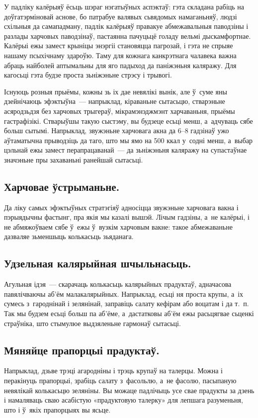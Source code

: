 У падліку калёрыяў ёсьць шэраг нэгатыўных аспэктаў: гэта складана рабіць на доўгатэрміновай аснове, бо патрабуе валявых сьвядомых намаганьняў, людзі схільныя да самападману, падлік калёрыяў правакуе абмежавальныя паводзіны і разлады харчовых паводзінаў, пастаянна пачуцьцё голаду вельмі дыскамфортнае. Калёрыі ежы замест крыніцы энэргіі становяцца пагрозай, і гэта не спрыяе нашаму псыхічнаму здароўю. Таму для кожнага канкрэтнага чалавека важна абраць найболей аптымальны для яго падыход да паніжэньня каляражу. Для кагосьці гэта будзе проста зьніжэньне стрэсу і трывогі.

Існуюць розныя прыёмы, кожны зь іх дае невялікі вынік, але ў~суме яны дзейнічаюць эфэктыўна~--- напрыклад, кіраваньне сытасьцю, стварэньне асяродзьдзя без харчовых трыгераў, мікрамэнэджмэнт харчаваньня, прыёмы гастрафізікі. Стварыўшы такую сыстэму, вы будзеце есьці менш, а~адчуваць сябе больш сытымі. Напрыклад, звужэньне харчовага акна да 6--8 гадзінаў ужо аўтаматычна прыводзіць да таго, што мы ямо на 500 ккал у~содні менш, а~выбар цэльнай ежы замест перапрацаванай~--- да зьніжэньня каляражу на супастаўнае значэньне пры захаваньні ранейшай сытасьці.

\subsection*{Харчовае ўстрыманьне.}
Да ліку самых эфэктыўных стратэгіяў адносіцца звужэньне харчовага вакна і пэрыядычны фастынг, пра якія мы казалі вышэй. Лічым гадзіны, а~не калёрыі, і не абмяжоўваем сябе ў~ежы ў~вузкім харчовым вакне: такое абмежаваньне дазваляе зьменшыць колькасьць зьяданага.

\subsection*{Удзельная калярыйная шчыльнасьць.}
Агульная ідэя~--- скарачаць колькасьць калярыйных прадуктаў, адначасова павялічваючы аб'ём малакалярыйных. Напрыклад, есьці ня проста крупы, а~іх сумесь з~гароднінай і зелянінай, заправіць салату кефірам або воцатам і да т.~п. Так мы будзем есьці больш па аб'ёме, а~дастатковы аб'ём ежы расьцягвае сьценкі страўніка, што стымулюе выдзяленьне гармонаў сытасьці.

\subsection*{Мяняйце прапорцыі прадуктаў.}
Напрыклад, дзьве трэці агародніны і трэць крупаў на талерцы. Можна і перакінуць прапорцыі, зрабіць салату з~фасольлю, а~не фасолю, пасыпаную невялікай колькасьцю зеляніны. Вы можаце падлічыць усе свае прадукты за дзень і намаляваць сваю асабістую «прадуктовую талерку» для лепшага разуменьня, што і ў~якіх прапорцыях вы ясьце. 

